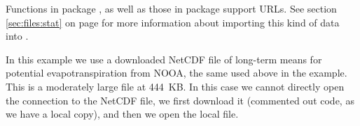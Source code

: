 \documentclass[krantz2]{krantz}\usepackage{knitr}%
\begin{document}
Functions in package , as well as those in package  support URLs. See section \ref{sec:files:stat} on page \pageref{sec:files:stat} for more information about importing this kind of data into \Rlang.

\begin{knitrout}\footnotesize
{}\color{fgcolor}\begin{kframe}
\begin{alltt}
 \hlkwb{<-}
  \hlstd{(} \hlstd{=} \hlstd{,}
             \hlstd{=} \hlstd{)}
\end{alltt}
\end{kframe}
\end{knitrout}

\begin{knitrout}\footnotesize
{}\color{fgcolor}\begin{kframe}
\begin{alltt}
 \hlkwb{<-}
    \hlstd{(} \hlstd{=} \hlstd{)}
\end{alltt}
\end{kframe}
\end{knitrout}

In this example we use a downloaded NetCDF file of long-term means for potential evapotranspiration from NOOA, the same used above in the  example. This is a moderately large file at 444~KB. In this case we cannot directly open the connection to the NetCDF file, we first download it (commented out code, as we have a local copy), and then we open the local file.

\begin{knitrout}\footnotesize
{}\color{fgcolor}\begin{kframe}
\begin{alltt}
 \hlkwb{<-} \hlstd{(}\hlstd{,}
                \hlstd{,}
                 \hlstd{=} \hlstd{)}
 \hlkwb{<-} \hlstd{(}\hlstd{)}
\end{alltt}
\end{kframe}
\end{knitrout}
\end{document}
